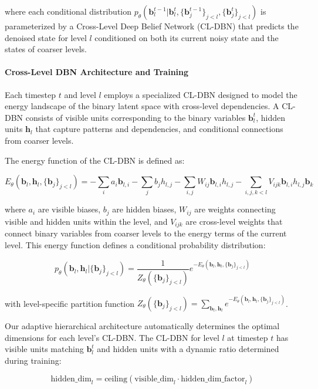 \documentclass[10pt,twocolumn,letterpaper]{article}
\newcommand{\bm}[1]{\boldsymbol{#1}}
\newcommand{\binary}{\bm{b}}
\begin{document}
where each conditional distribution $p_\theta(\binary_l^{t-1}|\binary_l^t, \{\binary_j^{t-1}\}_{j<l}, \{\binary_j^{t}\}_{j<l})$ is parameterized by a Cross-Level Deep Belief Network (CL-DBN) that predicts the denoised state for level $l$ conditioned on both its current noisy state and the states of coarser levels.

\paragraph{Cross-Level DBN Architecture and Training}
Each timestep $t$ and level $l$ employs a specialized CL-DBN designed to model the energy landscape of the binary latent space with cross-level dependencies. A CL-DBN consists of visible units corresponding to the binary variables $\binary_l^t$, hidden units $\bm{h}_l$ that capture patterns and dependencies, and conditional connections from coarser levels.

The energy function of the CL-DBN is defined as:

\begin{equation}
E_\theta(\binary_l, \bm{h}_l, \{\binary_j\}_{j<l}) = -\sum_i a_i \binary_{l,i} - \sum_j b_j h_{l,j} - \sum_{i,j} W_{ij} \binary_{l,i} h_{l,j} - \sum_{i,j,k<l} V_{ijk} \binary_{l,i} h_{l,j} \binary_{k}
\end{equation}

where $a_i$ are visible biases, $b_j$ are hidden biases, $W_{ij}$ are weights connecting visible and hidden units within the level, and $V_{ijk}$ are cross-level weights that connect binary variables from coarser levels to the energy terms of the current level. This energy function defines a conditional probability distribution:

\begin{equation}
p_\theta(\binary_l, \bm{h}_l | \{\binary_j\}_{j<l}) = \frac{1}{Z_\theta(\{\binary_j\}_{j<l})} e^{-E_\theta(\binary_l, \bm{h}_l, \{\binary_j\}_{j<l})}
\end{equation}

with level-specific partition function $Z_\theta(\{\binary_j\}_{j<l}) = \sum_{\binary_l, \bm{h}_l} e^{-E_\theta(\binary_l, \bm{h}_l, \{\binary_j\}_{j<l})}$.

Our adaptive hierarchical architecture automatically determines the optimal dimensions for each level's CL-DBN. The CL-DBN for level $l$ at timestep $t$ has visible units matching $\binary_l^t$ and hidden units with a dynamic ratio determined during training:

\begin{equation}
\text{hidden\_dim}_l = \text{ceiling}(\text{visible\_dim}_l \cdot \text{hidden\_dim\_factor}_l)
\end{equation}
\end{document}
